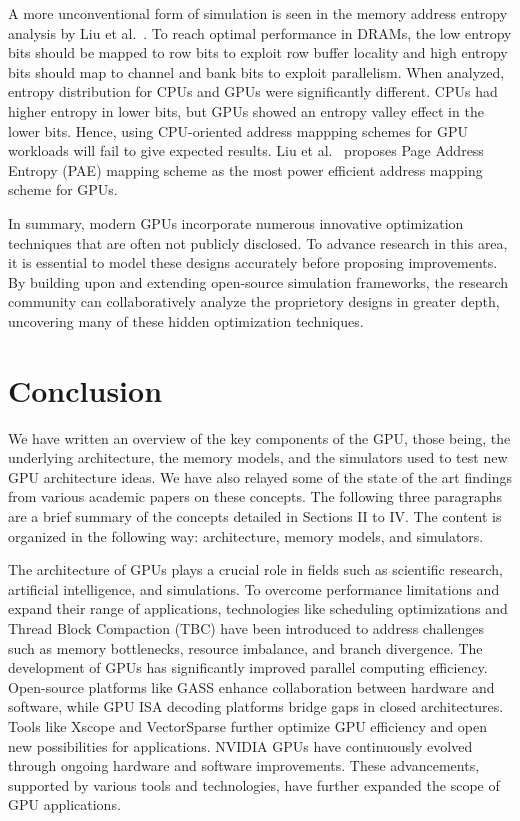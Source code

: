 \documentclass[conference]{IEEEtran}
\begin{document}
A more unconventional form of simulation is seen in the memory address entropy analysis by Liu et al.~\cite{Liu2018}.
To reach optimal performance in DRAMs, the low entropy bits should be mapped to row bits to exploit row buffer locality and high entropy bits should map to channel and bank bits to exploit parallelism.
When analyzed, entropy distribution for CPUs and GPUs were significantly different.
CPUs had higher entropy in lower bits, but GPUs showed an entropy valley effect in the lower bits.
Hence, using CPU-oriented address mappping schemes for GPU workloads will fail to give expected results.
Liu et al.~\cite{Liu2018} proposes Page Address Entropy (PAE) mapping scheme as the most power efficient address mapping scheme for GPUs.

In summary, modern GPUs incorporate numerous innovative optimization techniques that are often not publicly disclosed.
To advance research in this area, it is essential to model these designs accurately before proposing improvements.
By building upon and extending open-source simulation frameworks, the research community can collaboratively analyze the proprietory designs in greater depth, uncovering many of these hidden optimization techniques.

\section{Conclusion}
We have written an overview of the key components of the GPU, those being, the underlying architecture, the memory models, and the simulators used to test new GPU architecture ideas.
We have also relayed some of the state of the art findings from various academic papers on these concepts.
The following three paragraphs are a brief summary of the concepts detailed in Sections II to IV. The content is organized in the following way: architecture, memory models, and simulators.

The architecture of GPUs plays a crucial role in fields such as scientific research, artificial intelligence, and simulations. 
To overcome performance limitations and expand their range of applications, technologies like scheduling optimizations and Thread Block Compaction (TBC) have been introduced to address challenges such as memory bottlenecks, resource imbalance, and branch divergence.
The development of GPUs has significantly improved parallel computing efficiency. 
Open-source platforms like GASS enhance collaboration between hardware and software, while GPU ISA decoding platforms bridge gaps in closed architectures. 
Tools like Xscope and VectorSparse further optimize GPU efficiency and open new possibilities for applications.
NVIDIA GPUs have continuously evolved through ongoing hardware and software improvements. 
These advancements, supported by various tools and technologies, have further expanded the scope of GPU applications.
\end{document}
